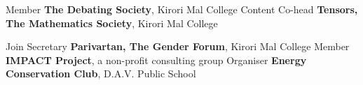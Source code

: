 {Member}
{\textbf{The Debating Society}, Kirori Mal College}
{}
%
%
{Content Co-head}
{\textbf{Tensors, The Mathematics Society}, Kirori Mal College}
{
}

{Join Secretary}
{\textbf{Parivartan, The Gender Forum}, Kirori Mal College}
{
}
{Member}
{\textbf{IMPACT Project}, a non-profit consulting group}
{ }
{Organiser}
{\textbf{Energy Conservation Club}, D.A.V. Public School}
{
}